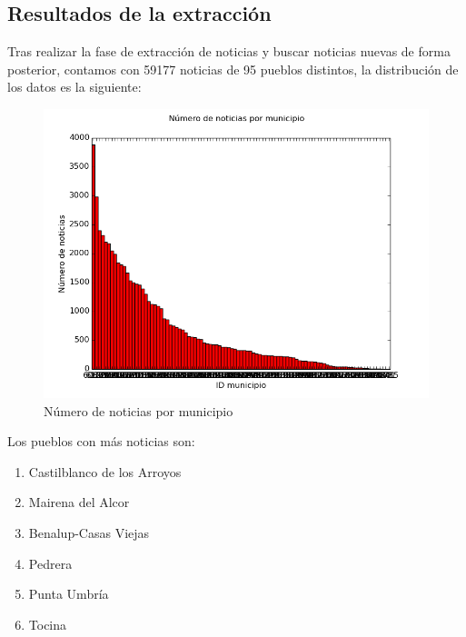 \subsection{Resultados de la extracción}

Tras realizar la fase de extracción de noticias y buscar noticias nuevas de forma posterior, contamos con 59177 noticias de 95 pueblos distintos, la distribución de los datos es la siguiente:
\begin{center}
\begin{figure}[h]
\centering
\includegraphics[scale=0.6]{Extraccion/imagenes/histograma.png}
\caption{Número de noticias por municipio}
\end{figure}
\end{center}
Los pueblos con más noticias son:
\begin{center}

\begin{multicols}{2}
\begin{enumerate}
\item Castilblanco de los Arroyos %
\item Mairena del Alcor %
\item Benalup-Casas Viejas %
\item Pedrera %
\item Punta Umbría %
\item Tocina %
\end{enumerate}
\end{multicols}
\end{center}


